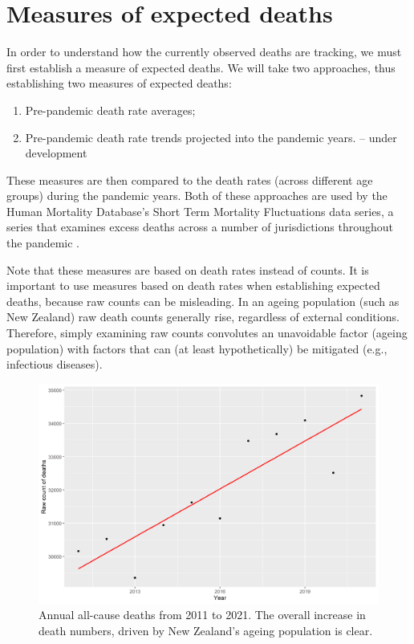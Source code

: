 \documentclass[
10pt, %
a4paper, %
oneside, %
DIV=16,
parskip=full,
headinclude,footinclude %
]{scrartcl}
\begin{document}
\section{Measures of expected deaths}\label{sec:method}

In order to understand how the currently observed deaths are tracking, we must first establish a measure of expected deaths. We will take two approaches, thus establishing two measures of expected deaths:

\begin{enumerate}[noitemsep] %
\item Pre-pandemic death rate averages;
\item Pre-pandemic death rate trends projected into the pandemic years. -- under development
\end{enumerate}

These measures are then compared to the death rates (across different age groups) during the pandemic years. Both of these approaches are used by the Human Mortality Database's Short Term Mortality Fluctuations data series, a series that examines excess deaths across a number of jurisdictions throughout the pandemic \cite{hmd_excess2021}.

Note that these measures are based on death rates instead of counts. It is important to use measures based on death rates when establishing expected deaths, because raw counts can be misleading. In an ageing population (such as New Zealand) raw death counts generally rise, regardless of external conditions. Therefore, simply examining raw counts convolutes an unavoidable factor (ageing population) with factors that can (at least hypothetically) be mitigated (e.g., infectious diseases).

\begin{figure}[htb!]
\centering 
\includegraphics[width = 1.0 \columnwidth]{plots/deaths_over_time} 
\caption[Annual deaths over time]{Annual all-cause deaths from 2011 to 2021. The overall increase in death numbers, driven by New Zealand's ageing population is clear.} 
\label{fig:deaths_time} 
\end{figure}
\end{document}
